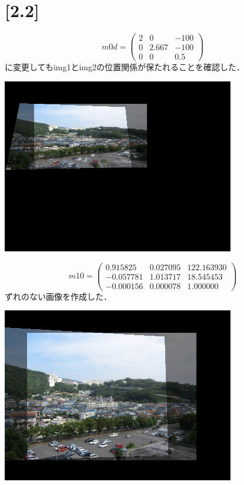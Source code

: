 \documentclass[11pt]{jarticle}
\begin{document}
\section{[2.2]}

\[
  m0d = \left(
    \begin{array}{ccc}
      2 & 0 & -100 \\
      0 & 2.667 & -100 \\
      0 & 0 & 0.5
    \end{array}
  \right)
\]
に変更してもimg1とimg2の位置関係が保たれることを確認した．

\includegraphics[scale=.5]{./img/img01.png}


\[
  m10 = \left(
    \begin{array}{ccc}
        0.915825 & 0.027095 & 122.163930 \\
        -0.057781 & 1.013717 & 18.545453 \\
        -0.000156 & 0.000078 & 1.000000
    \end{array}
  \right)
\] 
ずれのない画像を作成した．

\includegraphics[scale=.5]{./img/zurenashi.png}
\end{document}
